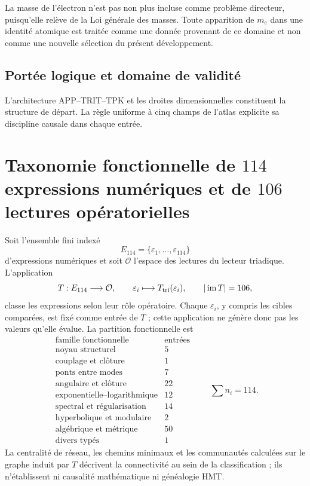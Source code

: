 La masse de l’électron n’est pas non plus incluse comme problème directeur, puisqu’elle
relève de la Loi générale des masses. Toute apparition de \(m_e\) dans une
identité atomique est traitée comme une donnée provenant de ce domaine et non comme
une nouvelle sélection du présent développement.

\subsection*{Portée logique et domaine de validité}
L’architecture APP--TRIT--TPK et les droites dimensionnelles constituent la
structure de départ. La règle uniforme à cinq champs de l’atlas explicite
sa discipline causale dans chaque entrée.



\section{Taxonomie fonctionnelle de \(114\) expressions numériques et de \(106\) lectures opératorielles}
\label{p3-83-c23-s2:sec:atlas-taxonomico-114-constantes-rev11}

Soit l’ensemble fini indexé
\[
 E_{114}=\{\varepsilon_1,\ldots,\varepsilon_{114}\}
\]
d’expressions numériques et soit \(\mathcal O\) l’espace des lectures du
lecteur triadique. L’application
\[
 T:E_{114}\longrightarrow\mathcal O,
 \qquad \varepsilon_i\longmapsto T_{\rm tri}(\varepsilon_i),
 \qquad |\operatorname{im}T|=106,
\]
classe les expressions selon leur rôle opératoire. Chaque
\(\varepsilon_i\), y compris les cibles comparées, est fixé comme
entrée de \(T\) ; cette application ne génère donc pas les valeurs qu’elle
évalue. La partition fonctionnelle est
\[
\begin{array}{l|r}
\text{famille fonctionnelle}&\text{entrées}\\ \hline
\text{noyau structurel}&5\\
\text{couplage et clôture}&1\\
\text{ponts entre modes}&7\\
\text{angulaire et clôture}&22\\
\text{exponentielle--logarithmique}&12\\
\text{spectral et régularisation}&14\\
\text{hyperbolique et modulaire}&2\\
\text{algébrique et métrique}&50\\
\text{divers typés}&1
\end{array}
\qquad
\sum n_i=114.
\]
La centralité de réseau, les chemins minimaux et les communautés calculées sur
le graphe induit par \(T\) décrivent la connectivité au sein de la classification ;
ils n’établissent ni causalité mathématique ni généalogie HMT.

